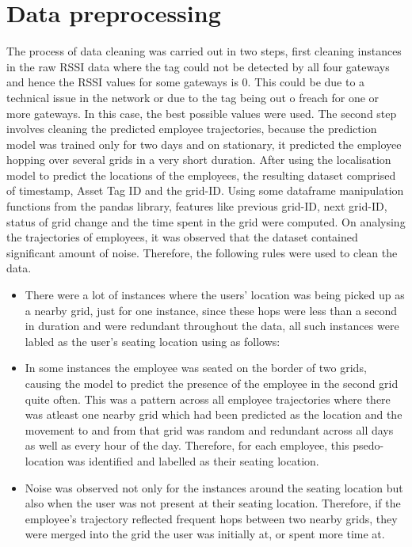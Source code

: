\documentclass[acmtog]{acmart}
\begin{document}


\section{Data preprocessing}
The process of data cleaning was carried out in two steps, first cleaning instances in the raw RSSI data where the tag could not be detected by all four gateways and hence the RSSI values for some gateways is 0. This could be due to a technical issue in the network or due to the tag being out o freach for one or more gateways. In this case, the best possible values were used. The second step involves cleaning the predicted employee trajectories, because the prediction model was trained only for two days and on stationary, it predicted the employee hopping over several grids in a very short duration.  
After using the localisation model to predict the locations of the employees, the resulting dataset comprised of timestamp, Asset Tag ID and the grid-ID. Using some dataframe manipulation functions from the pandas library, features like previous grid-ID, next grid-ID, status of grid change and the time spent in the grid were computed. On analysing the trajectories of employees, it was observed that the dataset contained significant amount of noise. Therefore, the following rules were used to clean the data.
  
\begin{itemize}
    \item There were a lot of instances where the users' location was being picked up as a nearby grid, just for one instance, since these hops were less than a second in duration and were redundant throughout the data, all such instances were labled as the user's seating location using as follows:
    \item In some instances the employee was seated on the border of two grids, causing the model to predict the presence of the employee in the second grid quite often. This was a pattern across all employee trajectories where there was atleast one nearby grid which had been predicted as the location and the movement to and from that grid was random and redundant across all days as well as every hour of the day. Therefore, for each employee, this psedo-location was identified and labelled as their seating location.
    \item Noise was observed not only for the instances around the seating location but also when the user was not present at their seating location. Therefore, if the employee's trajectory reflected frequent hops between two nearby grids, they were merged into the grid the user was initially at, or spent more time at.
\end{itemize}
\end{document}
